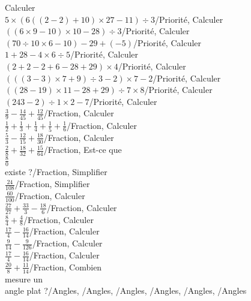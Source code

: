\documentclass[a4paper,landscape]{article}
\newcommand{\pr}{Priorité}
\newcommand{\fr}{Fraction}
\newcommand{\an}{Angles}
\begin{document}
{    Calculer \\ \tiny$5\times(6((2-2)+10)\times27-11)\div3$\normalsize/\pr,
    Calculer \\ \tiny $((6\times9-10)\times10-28)\div3$/\pr,
    Calculer \\ \tiny $(70\div10\times6-10)-29+(-5)$/\pr,
    Calculer \\ \tiny $1+28-4\times 6\div5$/\pr,
    Calculer \\ \tiny $(2+2-2+6-28+29)\times4$/\pr,
    Calculer \\ \tiny $(((3-3)\times7+9)\div3-2)\times7-2$/\pr,
    Calculer \\ \tiny $((28-19)\times11-28+29)\div7\times8$/\pr,
    Calculer \\ \tiny $(243-2)\div1\times2-7$/\pr,
    Calculer \\ $\frac{3}{9}-\frac{14}{45}+\frac{12}{45}$/\fr,
    Calculer \\ $\frac{1}{2}+\frac{1}{3}+\frac{1}{4}+\frac{1}{5}+\frac{1}{6}$/\fr,
    Calculer \\ $\frac{5}{3}-\frac{12}{15}+\frac{18}{30}$/\fr,
    Calculer \\ $\frac{2}{8}+\frac{18}{32}+\frac{15}{64}$/\fr,
    Est-ce que \\ $\frac{8}{0}$ \\ existe ?/\fr,
    Simplifier \\ $\frac{24}{108}$/\fr,
    Simplifier \\ $\frac{60}{100}$/\fr,
    Calculer \\ $\frac{27}{27}+\frac{33}{3}-\frac{18}{6}$/\fr,
    Calculer \\ $\frac{8}{4}+\frac{4}{8}$/\fr,
    Calculer \\ $\frac{17}{4}-\frac{16}{14}$/\fr,
    Calculer \\ $\frac{9}{14}-\frac{9}{126}$/\fr,
    Calculer \\ $\frac{17}{4}-\frac{16}{14}$/\fr,
    Calculer \\ $\frac{20}{8}+\frac{11}{14}$/\fr,
    Combien \\mesure un \\angle plat ?/\an,
    /\an,
    /\an,
    /\an,
    /\an,
    /\an
}
\end{document}
